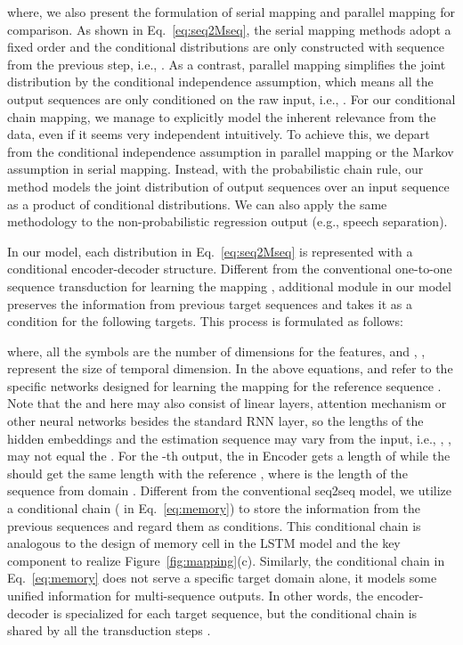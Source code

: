 \documentclass{article}
\begin{document}
where, we also present the formulation of serial mapping and parallel mapping for comparison. As shown in Eq.~\ref{eq:seq2Mseq}, the serial mapping methods adopt a fixed order and the conditional distributions are only constructed with sequence from the previous step, i.e., .
As a contrast, parallel mapping simplifies the joint distribution by the conditional independence assumption, which means all the output sequences are only conditioned on the raw input, i.e., . 
For our conditional chain mapping, we manage to explicitly model the inherent relevance from the data,
even if it seems very independent intuitively. To achieve this, we depart from the conditional independence assumption in parallel mapping or the Markov assumption in serial mapping. Instead, with the probabilistic chain rule, our method models the joint distribution of output sequences over an input sequence  as a product of conditional distributions. 
We can also apply the same methodology to the non-probabilistic regression output (e.g., speech separation).


In our model, each distribution  in Eq.~\ref{eq:seq2Mseq}  is represented with a conditional encoder-decoder structure.
Different from the conventional one-to-one sequence transduction for learning the mapping , additional module in our model preserves the information from previous target sequences and takes it as a condition for the following targets. 
This process is formulated as follows:
\vspace{-0.15cm}

where, all the  symbols are the number of dimensions for the features, and , ,  represent the size of temporal dimension. In the above equations,  and  refer to the specific networks designed for learning the mapping for the reference sequence . Note that the  and  here may also consist of linear layers, attention mechanism or other neural networks besides the standard RNN layer, so the lengths of the hidden embeddings  and the estimation sequence  may vary from the input, i.e., , ,  may not equal the . For the -th output, the  in Encoder gets a length of  while the  should get the same length with the reference , where  is the length of the sequence  from domain . 
Different from the conventional seq2seq model, we utilize a conditional chain ( in Eq.~\ref{eq:memory}) to store the information from the previous sequences and regard them as conditions.
This conditional chain is analogous to the design of memory cell in the LSTM model and the key component to realize Figure~\ref{fig:mapping}(c). 
Similarly, the conditional chain in Eq.~\ref{eq:memory} does not serve a specific target domain alone, it models some unified information for multi-sequence outputs. In other words, the encoder-decoder is specialized for each target sequence, but the conditional chain is shared by all the transduction steps .
\end{document}
